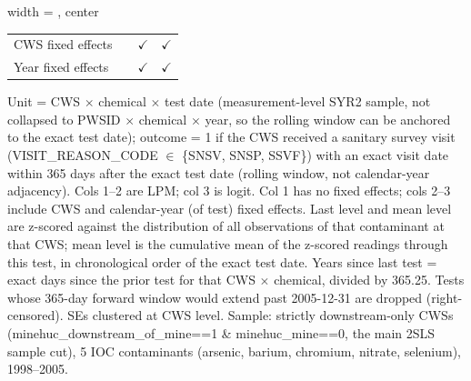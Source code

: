 \begin{table}[htbp]
\begin{adjustbox}{width = \textwidth, center}
\begin{tabular}{lccc}
          \\
         
         CWS fixed effects     &                & $\checkmark$          & $\checkmark$\\   
         Year fixed effects    &                & $\checkmark$          & $\checkmark$\\   
         
         \bottomrule
         
      \end{tabular}
      
      
      
   \end{adjustbox}
      {\tiny\linespread{1}\selectfont \par \raggedright 
   Unit = CWS $\times$ chemical $\times$ test date (measurement-level SYR2 sample, not collapsed to PWSID $\times$ chemical $\times$ year, so the rolling window can be anchored to the exact test date); outcome = 1 if the CWS received a sanitary survey visit (VISIT\_REASON\_CODE $\in$ \{SNSV, SNSP, SSVF\}) with an exact visit date within 365 days after the exact test date (rolling window, not calendar-year adjacency). Cols 1--2 are LPM; col 3 is logit. Col 1 has no fixed effects; cols 2--3 include CWS and calendar-year (of test) fixed effects. Last level and mean level are z-scored against the distribution of all observations of that contaminant at that CWS; mean level is the cumulative mean of the z-scored readings through this test, in chronological order of the exact test date. Years since last test = exact days since the prior test for that CWS $\times$ chemical, divided by 365.25. Tests whose 365-day forward window would extend past 2005-12-31 are dropped (right-censored). SEs clustered at CWS level. Sample: strictly downstream-only CWSs (minehuc\_downstream\_of\_mine==1 \& minehuc\_mine==0, the main 2SLS sample cut), 5 IOC contaminants (arsenic, barium, chromium, nitrate, selenium), 1998--2005.}
   
\end{table}


